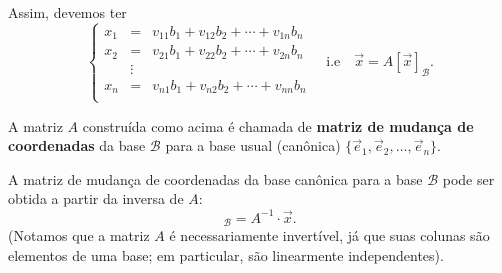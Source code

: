 Assim, devemos ter
\begin{equation}
\left\{
\begin{array}{lcl}
x_1 &=& v_{11} b_{1} + v_{12} b_{2} + \cdots + v_{1n} b_{n} \\
x_2 &=& v_{21} b_{1} + v_{22} b_{2} + \cdots + v_{2n} b_{n} \\
&\vdots& \\
x_n &=& v_{n1} b_{1} + v_{n2} b_{2} + \cdots + v_{nn} b_{n} \\
\end{array}
\right. \quad \text{i.e} \quad \vec{x} = A [\vec{x}]_{\mathcal{B}}.
\end{equation}

A matriz $A$ construída como acima é chamada de \textbf{matriz de mudança de coordenadas} da base $\mathcal{B}$ para a base usual (canônica) $\{ \vec{e}_1, \vec{e}_2, \dots, \vec{e}_n\}$.

A matriz de mudança de coordenadas da base canônica para a base $\mathcal{B}$ pode ser obtida a partir da inversa de $A$:
\begin{equation}
[\vec{x}]_{\mathcal{B}} = A^{-1} \cdot \vec{x}.
\end{equation} (Notamos que a matriz $A$ é necessariamente invertível, já que suas colunas são elementos de uma base; em particular, são linearmente independentes).

